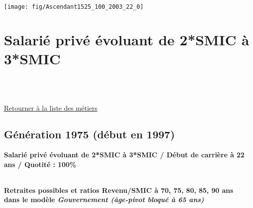  \vspace{0.1cm} 

 {\hspace{-2.2cm}\texttt{[image: fig/Ascendant1525\_100\_2003\_22\_0]}} 

\newpage 
 
\chapter{Salarié privé évoluant de 2*SMIC à 3*SMIC} 

~\\ 
 


   
 \localtableofcontents 

~\\ 
 
 \hyperlink{page.2}{\noindent Retourner à la liste des métiers}

 \newpage 

\section{Génération 1975 (début en 1997)\label{Ascendant23_100_1975_22_0}} 
 
{\bf \noindent Salarié privé évoluant de 2*SMIC à 3*SMIC / Début de carrière à 22 ans / Quotité : 100\%}  ~ 

 ~\\{\bf \noindent Retraites possibles et ratios Revenu/SMIC à 70, 75, 80, 85, 90 ans dans le modèle \emph{Gouvernement (âge-pivot bloqué à 65 ans)}}  
 
